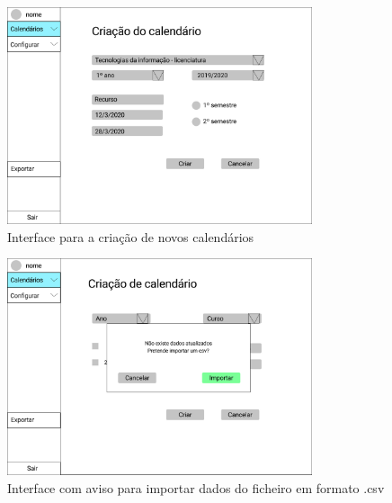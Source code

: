 \documentclass[11pt, twoside]{report}
\begin{document}
	\begin{figure}[H] 
		\centering 
		\includegraphics[width=0.8\textwidth,height=0.8\textheight,keepaspectratio]{image/prototipowireframes/criarcalendario}
		\caption{Interface para a criação de novos calendários}
		\label{interfacecriarcalendario}
	\end{figure}
	
	\begin{figure}[H] 
		\centering 
		\includegraphics[width=0.8\textwidth,height=0.8\textheight,keepaspectratio]{image/prototipowireframes/criarcalendarioimportar}
		\caption{Interface com aviso para importar dados do ficheiro em formato .csv}
		\label{interfaceimportarcsv}
	\end{figure}
	
	
	
\end{document}
